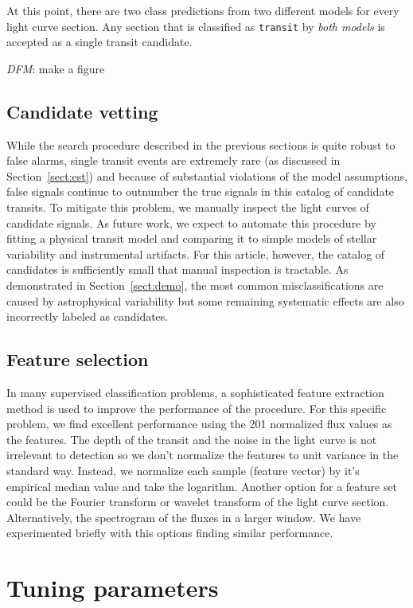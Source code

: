 \documentclass[12pt,preprint]{aastex}
\newcommand{\paper}{article}
\newcommand{\sectionname}{Section}
\newcommand{\sectref}[1]{\ref{sect:#1}}
\newcommand{\Sect}[1]{\sectionname~\sectref{#1}}
\newcommand{\sect}[1]{\Sect{#1}}
\newcommand{\sectlabel}[1]{\label{sect:#1}}
\newcommand{\todo}[3]{{\color{#2}\emph{#1}: #3}}
\newcommand{\dfmtodo}[1]{\todo{DFM}{red}{#1}}
\begin{document}
At this point, there are two class predictions from two different models for
every light curve section.
Any section that is classified as \texttt{transit} by \emph{both models} is
accepted as a single transit candidate.

\dfmtodo{make a figure}


\subsection{Candidate vetting}\sectlabel{vetting}

While the search procedure described in the previous sections is quite robust
to false alarms, single transit events are extremely rare (as discussed in
\sect{est}) and because of substantial violations of the model assumptions,
false signals continue to outnumber the true signals in this catalog of
candidate transits.
To mitigate this problem, we manually inspect the light curves of candidate
signals.
As future work, we expect to automate this procedure by fitting a physical
transit model and comparing it to simple models of stellar variability and
instrumental artifacts.
For this \paper, however, the catalog of candidates is sufficiently small that
manual inspection is tractable.
As demonstrated in \sect{demo}, the most common misclassifications are caused
by astrophysical variability but some remaining systematic effects are also
incorrectly labeled as candidates.


\subsection{Feature selection}\sectlabel{features}

In many supervised classification problems, a sophisticated feature
extraction method is used to improve the performance of the procedure.
For this specific problem, we find excellent performance using the 201
normalized flux values as the features.
The depth of the transit and the noise in the light curve is not irrelevant
to detection so we don't normalize the features to unit variance in the
standard way.
Instead, we normalize each sample (feature vector) by it's empirical median
value and take the logarithm.
Another option for a feature set could be the Fourier transform or wavelet
transform of the light curve section.
Alternatively, the spectrogram of the fluxes in a larger window.
We have experimented briefly with this options finding similar performance.


\section{Tuning parameters}\sectlabel{tuning}
\end{document}
